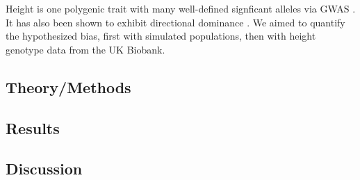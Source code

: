 \documentclass[a4paper,11pt]{article}
\begin{document}
Height is one polygenic trait with many well-defined signficant
alleles via GWAS \cite{heightselection}. It has also been shown to exhibit
directional dominance \cite{heightdirectdom}. We aimed to quantify the
hypothesized bias, first with simulated populations, then with height genotype data from the UK Biobank.



\subsection*{Theory/Methods}

\subsection*{Results}

\subsection*{Discussion}




\end{document}
